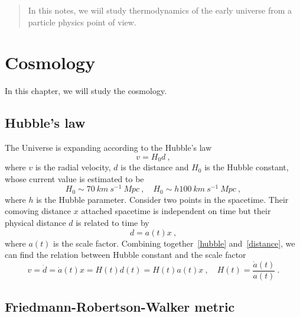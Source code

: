 \documentclass[a4paper]{article}
\begin{document}
 
 
\maketitle 

\begin{abstract}
    In this notes, we wiil study thermodynamics of the early universe from a particle physics point of view.
\end{abstract}


\tableofcontents
\newpage

\section{Cosmology}

    In this chapter, we will study the cosmology.

\subsection{Hubble's law}

    The Universe is expanding according to the Hubble's law
    \begin{equation}\label{hubble}
        v = H_0 d ~,
    \end{equation}
    where $v$ is the radial velocity, $d$ is the distance and $H_0$ is the Hubble constant, whose current value is estimated to be
    \begin{equation*}
        H_0 \sim 70 ~ km ~ s^{-1} ~ Mpc ~, \quad H_0 \sim h 100 ~ km ~ s^{-1} ~ Mpc ~,
    \end{equation*}
    where $h$ is the Hubble parameter. Consider two points in the spacetime. Their comoving distance $x$ attached spacetime is independent on time but their physical distance $d$ is related to time by 
    \begin{equation}\label{distance}
        d = a(t) x ~,
    \end{equation}
    where $a(t)$ is the scale factor. 
    Combining together~\eqref{hubble} and~\eqref{distance}, we can find the relation between Hubble constant and the scale factor
    \begin{equation*}
        v = \dot d = \dot a (t) x = H(t) d(t) = H(t) a(t) x ~, \quad H(t) = \frac{\dot a(t)}{a(t)} ~.
    \end{equation*}

\subsection{Friedmann-Robertson-Walker metric}
\end{document}
